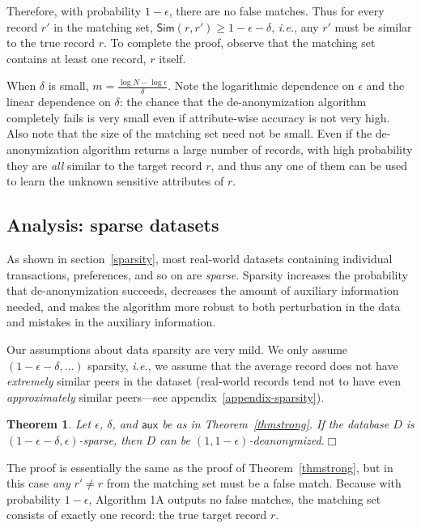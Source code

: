 \documentclass[11pt]{article}
\newcommand{\ie}{\emph{i.e.}}
\newcommand{\Sim}{\textsf{Sim}}
\newcommand{\aux}{\textsf{aux}}
\newtheorem{theorem}{Theorem}
\newcommand{\qed}{\hfill \ensuremath{\Box}}
\begin{document}
Therefore, with probability $1-\epsilon$, there are no false matches.
Thus for every record $r'$ in the matching set, $\Sim(r, r') \geq
1-\epsilon-\delta$, \ie, any $r'$ must be similar to the true record $r$.
To complete the proof, observe that the matching set contains at least
one record, $r$ itself.

When $\delta$ is small, $m=\frac{\log N-\log \epsilon}\delta$.  Note the
logarithmic dependence on $\epsilon$ and the linear dependence on
$\delta$: the chance that the de-anonymization algorithm completely
fails is very small even if attribute-wise accuracy is not very high.
Also note that the size of the matching set need not be small.  Even if
the de-anonymization algorithm returns a large number of records, with
high probability they are \emph{all} similar to the target record $r$,
and thus any one of them can be used to learn the unknown sensitive
attributes of $r$.


\subsection{Analysis: sparse datasets}
\label{analysis-sparse}

As shown in section~\ref{sparsity}, most real-world datasets containing
individual transactions, preferences, and so on are \emph{sparse}.
Sparsity increases the probability that de-anonymization succeeds,
decreases the amount of auxiliary information needed, and makes the
algorithm more robust to both perturbation in the data and mistakes in
the auxiliary information.  

Our assumptions about data sparsity are very mild.  We only assume
$(1-\epsilon-\delta,\ldots)$ sparsity, \ie, we assume that the average
record does not have \emph{extremely} similar peers in the dataset
(real-world records tend not to have even \emph{approximately} similar
peers---see appendix~\ref{appendix-sparsity}).

\begin{theorem}\label{thmmid}
Let $\epsilon$, $\delta$, and $\aux$ be as in Theorem~\ref{thmstrong}.
If the database $D$ is $(1-\epsilon-\delta,\epsilon)$-sparse, then $D$
can be $(1, 1-\epsilon)$-deanonymized.\qed
\end{theorem}

The proof is essentially the same as the proof of Theorem~\ref{thmstrong},
but in this case \emph{any} $r' \neq r$ from the matching set must be a
false match.  Because with probability $1-\epsilon$, Algorithm 1A
outputs no false matches, the matching set consists of exactly one record:
the true target record $r$.
\end{document}

